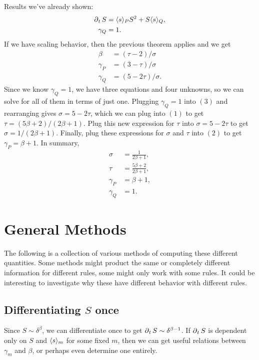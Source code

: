 \documentclass[twoside,10pt]{report}
\begin{document}
Results we've already shown:
\begin{align*}
	\operatorname{\partial}_{t}{S} &= \langle s \rangle_{P} S^2 + S\langle s \rangle_{Q}, \\
	\gamma_{Q} &= 1.
\end{align*}
If we have scaling behavior, then the previous theorem applies and we get
\begin{align*}
	\beta &= (\tau-2)/\sigma \tag{1} \\
	\gamma_{P} &= (3-\tau)/\sigma \tag{2} \\
	\gamma_{Q} &= (5-2\tau)/\sigma. \tag{3}
\end{align*}
Since we know $\gamma_{Q}=1$, we have three equations and four unknowns, so we can solve for all of them in terms of just one. Plugging $\gamma_{Q}=1$ into $(3)$ and rearranging gives $\sigma=5-2\tau$, which we can plug into $(1)$ to get $\tau = (5\beta+2)/(2\beta+1)$. Plug this new expression for $\tau$ into $\sigma=5-2\tau$ to get $\sigma = 1/(2\beta+1)$. Finally, plug these expressions for $\sigma$ and $\tau$ into $(2)$ to get $\gamma_{P} = \beta+1$. In summary,
\begin{align*}
	\sigma &= \frac{1}{2\beta+1} , \\
	\tau &= \frac{5\beta+2}{2\beta+1} , \\
	\gamma_{P} &= \beta+1, \\
	\gamma_{Q} &= 1.
\end{align*}


\section{General Methods}

The following is a collection of various methods of computing these different quantities. Some methods might product the same or completely different information for different rules, some might only work with some rules. It could be interesting to investigate why these have different behavior with different rules.


\subsection{Differentiating \texorpdfstring{$S$}{S} once}

Since $S \sim \delta^{\beta}$, we can differentiate once to get $\operatorname{\partial}_{t}{S} \sim \delta^{\beta-1}$. If $\operatorname{\partial}_{t}{S} $ is dependent only on $S$ and $\langle s \rangle_{m}$ for some fixed $m$, then we can get useful relations between $\gamma_{m}$ and $\beta$, or perhaps even determine one entirely.
\end{document}

